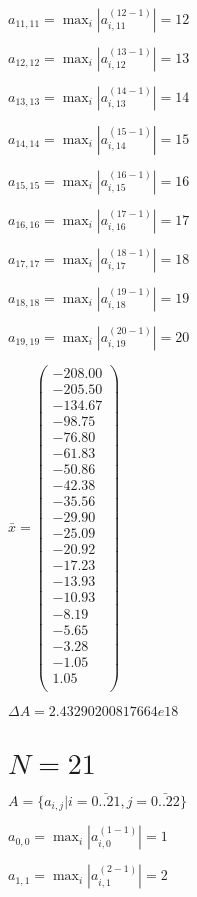 \documentclass[a4paper,12pt]{article}
\begin{document}
$a _{ 11, 11 } =  \max _i |a _{ i, 11 } ^{ (12 - 1) } | = 12$

$a _{ 12, 12 } =  \max _i |a _{ i, 12 } ^{ (13 - 1) } | = 13$

$a _{ 13, 13 } =  \max _i |a _{ i, 13 } ^{ (14 - 1) } | = 14$

$a _{ 14, 14 } =  \max _i |a _{ i, 14 } ^{ (15 - 1) } | = 15$

$a _{ 15, 15 } =  \max _i |a _{ i, 15 } ^{ (16 - 1) } | = 16$

$a _{ 16, 16 } =  \max _i |a _{ i, 16 } ^{ (17 - 1) } | = 17$

$a _{ 17, 17 } =  \max _i |a _{ i, 17 } ^{ (18 - 1) } | = 18$

$a _{ 18, 18 } =  \max _i |a _{ i, 18 } ^{ (19 - 1) } | = 19$

$a _{ 19, 19 } =  \max _i |a _{ i, 19 } ^{ (20 - 1) } | = 20$

$\bar { x } = \begin{pmatrix}
-208.00 \\
-205.50 \\
-134.67 \\
-98.75 \\
-76.80 \\
-61.83 \\
-50.86 \\
-42.38 \\
-35.56 \\
-29.90 \\
-25.09 \\
-20.92 \\
-17.23 \\
-13.93 \\
-10.93 \\
-8.19 \\
-5.65 \\
-3.28 \\
-1.05 \\
1.05 \\
\end{pmatrix}
$

$\Delta A = 2.43290200817664e18$



\section{ $N = 21$ }
$A = \{ a _{ i, j } | i = \bar { 0..21 }, j = \bar { 0..22 } \}$

$a _{ 0, 0 } =  \max _i |a _{ i, 0 } ^{ (1 - 1) } | = 1$

$a _{ 1, 1 } =  \max _i |a _{ i, 1 } ^{ (2 - 1) } | = 2$
\end{document}
